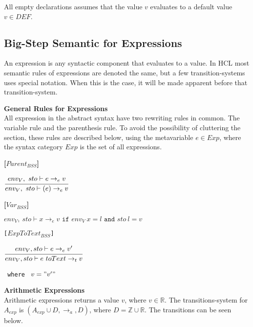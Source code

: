 All empty declarations assumes that the value $v$ evaluates to a default value $v \in DEF$.

\subsection{Big-Step Semantic for Expressions}
An expression is any syntactic component that evaluates to a value.
In HCL most semantic rules of expressions are denoted the same, but a few transition-systems uses special notation.
When this is the case, it will be made apparent before that transition-system.

\textbf{\large{General Rules for Expressions}} \\
All expression in the abstract syntax have two rewriting rules in common.
The variable rule and the parenthesis rule.
To avoid the possibility of cluttering the section, these rules are described below, using the metavariable $e \in Exp$, where the syntax category $Exp$ is the set of all expressions.

\textbf{[$Parent_{BSS}$]}
\begin{center}
	\begin{math}
	\cfrac
		{env_V,\ sto \vdash e \rightarrow_e v}
		{env_V,\ sto \vdash (e) \rightarrow_e v}
	\end{math}
\end{center}

\textbf{[$Var_{BSS}$]}
\begin{center}
	\begin{math}
	env_V,\ sto \vdash x \rightarrow_e v
	\texttt{ if } env_V\ x = l
	\texttt{ and } sto\ l = v
	\end{math}
\end{center}

\texttt{[$ExpToText_{BSS}$]}\\
\begin{center}
	\begin{math}
	\cfrac
	{env_V, sto \vdash e \rightarrow_{e} v'}
	{env_V, sto \vdash e\ toText \rightarrow_{t} v}
	\end{math}
	
	\texttt{ where } $v = "v'"$
\end{center}

\textbf{\large{Arithmetic Expressions}}\\
Arithmetic expressions returns a value $v$, where $v \in \mathbb{R}$.
The transitions-system for $A_{exp}$ is $(A_{exp} \cup D, \rightarrow_a, D)$, 
where $D = \mathbb{Z} \cup \mathbb{R}$.
The transitions can be seen below.

